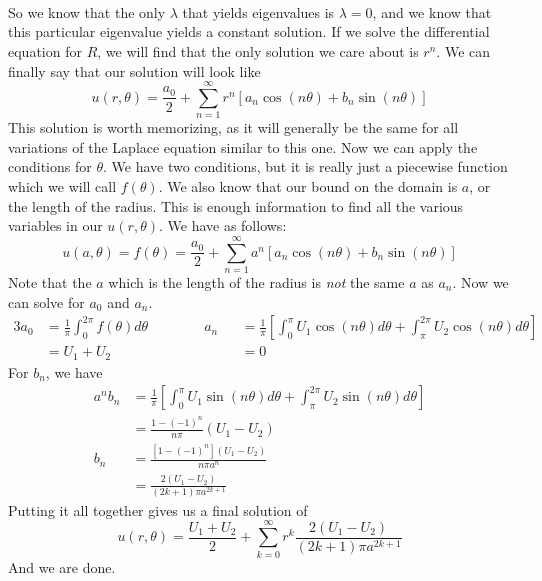 \documentclass{article}
\begin{document}
\noindent\\\\\\
\noindent So we know that the only $\lambda$ that yields eigenvalues is $\lambda = 0$, and we know that this particular eigenvalue yields a constant solution. If we solve the differential equation for $R$, we will find that the only solution we care about is $r^{n}$. We can finally say that our solution will look like
\[
u(r,\theta) = \frac{a_{0}}{2} + \sum_{n=1}^{\infty}r^{n}[a_{n}\cos{(n\theta)} + b_{n}\sin{(n\theta)}]
\]
This solution is worth memorizing, as it will generally be the same for all variations of the Laplace equation similar to this one. Now we can apply the conditions for $\theta$. We have two conditions, but it is really just a piecewise function which we will call $f(\theta)$. We also know that our bound on the domain is $a$, or the length of the radius. This is enough information to find all the various variables in our $u(r,\theta)$. We have as follows:
\[
u(a,\theta) = f(\theta) = \frac{a_{0}}{2} + \sum_{n=1}^{\infty}a^{n}[a_{n}\cos{(n\theta)} + b_{n}\sin{(n\theta)}]
\]
Note that the $a$ which is the length of the radius is \textit{not} the same $a$ as $a_{n}$. Now we can solve for $a_{0}$ and $a_{n}$.
\begin{alignat*}{3}
a_{0} &= \frac{1}{\pi}\int_{0}^{2\pi}f(\theta)d\theta \qquad\qquad a_{n} &&= \frac{1}{\pi}\left[\int_{0}^{\pi}U_{1}\cos{(n\theta)}d\theta + \int_{\pi}^{2\pi}U_{2}\cos{(n\theta)}d\theta\right]\\
&= U_{1} + U_{2} &&=0
\end{alignat*}
For $b_{n}$, we have
\begin{align*}
a^{n}b_{n} &= \frac{1}{\pi}\left[\int_{0}^{\pi}U_{1}\sin{(n\theta)}d\theta + \int_{\pi}^{2\pi}U_{2}\sin{(n\theta)}d\theta\right]\\
&= \frac{1 - (-1)^{n}}{n\pi}(U_{1} - U_{2})\\
b_{n} &= \frac{\left[1 - (-1)^{n}\right](U_{1} - U_{2})}{n\pi a^{n}}\\
&= \frac{2(U_{1} - U_{2})}{(2k+1)\pi a^{2k+1}}
\end{align*}
Putting it all together gives us a final solution of
\[
u(r,\theta) = \frac{U_{1} + U_{2}}{2} + \sum_{k=0}^{\infty}r^{k}\frac{2(U_{1} - U_{2})}{(2k+1)\pi a^{2k+1}}
\]
And we are done.
\newpage
\end{document}

